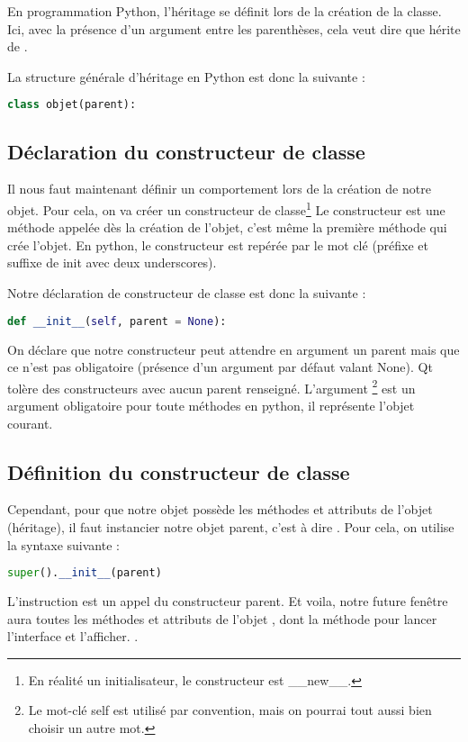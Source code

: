 En programmation Python, l'héritage se définit lors de la création de la classe.\newline
Ici, avec la présence d'un argument entre les parenthèses, cela veut dire que  hérite de .

La structure générale d'héritage en Python est donc la suivante : 
\begin{lstlisting}[language=Python]
class objet(parent):
\end{lstlisting}

\subsection{Déclaration du constructeur de classe}

Il nous faut maintenant définir un comportement lors de la création de notre objet. \newline
Pour cela, on va créer un constructeur de classe\footnote{En réalité un initialisateur, le constructeur est \_\_new\_\_.}
Le constructeur est une méthode appelée dès la création de l'objet, c'est même la première méthode qui crée l'objet. \newline
En python, le constructeur est repérée par le mot clé  (préfixe et suffixe de init avec deux underscores).

Notre déclaration de constructeur de classe est donc la suivante : 

\begin{lstlisting}[language=Python]
    def __init__(self, parent = None):
\end{lstlisting}

On déclare que notre constructeur peut attendre en argument un parent mais que ce n'est pas obligatoire (présence d'un argument par défaut valant None). \newline Qt tolère des constructeurs avec aucun parent renseigné. \newline
L'argument \footnote{Le mot-clé self est utilisé par convention, mais on pourrai tout aussi bien choisir un autre mot.} est un argument obligatoire pour toute méthodes en python, il représente l'objet courant. 

\subsection{Définition du constructeur de classe}

Cependant, pour que notre objet possède les méthodes et attributs de l'objet  (héritage), il faut instancier notre objet parent, c'est à dire .
Pour cela, on utilise la syntaxe suivante : 
\begin{lstlisting}[language=Python]
        super().__init__(parent)
\end{lstlisting}
L'instruction  est un appel du constructeur parent. \newline
Et voila, notre future fenêtre aura toutes les méthodes et attributs de l'objet , dont la méthode pour lancer l'interface et l'afficher. \newline.


